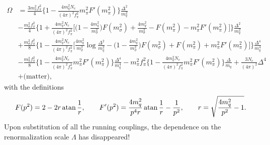 \begin{equation}
\begin{split}
	\Omega &= \frac{3 m_\pi^2 f_\pi^2}{4} \Bigg\{ 1 - \frac{4 m_q^2 N_c}{(4\pi)^2 f_\pi^2} m_\pi^2 F'(m_\pi^2) \Bigg\} \frac{\Delta^2}{m_q^2} \\
	       &- \frac{m_\sigma^2 f_\pi^2}{4} \Bigg\{ 1 + \frac{4 m_q^2 N_c}{(4\pi)^2 f_\pi^2} \Bigg[ \bigg(1 - \frac{4 m_q^2}{m_\sigma^2}\bigg) F(m_\sigma^2) + \frac{4 m_q^2}{m_\sigma^2} - F(m_\pi^2) - m_\pi^2 F'(m_\pi^2) \Bigg] \Bigg\} \frac{\Delta^2}{m_q^2} \\
	       &+ \frac{m_\sigma^2 f_\pi^2}{8} \Bigg\{ 1 - \frac{4 m_q^2 N_c}{(4 \pi)^2 f_\pi^2} \Bigg[ \frac{4 m_q^2}{m_\sigma^2} \log \frac{\Delta^2}{m_q^2} - \bigg(1 - \frac{4 m_q^2}{m_\sigma^2}\bigg) F(m_\sigma^2) + F(m_\pi^2) + m_\pi^2 F'(m_\pi^2) \Bigg] \Bigg\} \frac{\Delta^4}{m_q^4} \\
	       &- \frac{m_\pi^2 f_\pi^2}{8} \Bigg\{ 1 - \frac{4 m_q^2 N_c}{(4\pi)^2 f_\pi^2} m_\pi^2 F'(m_\pi^2) \Bigg\} \frac{\Delta^4}{m_q^4} - m_\pi^2 f_\pi^2 \Bigg\{ 1 - \frac{4 m_q^2 N_c}{(4\pi)^2 f_\pi^2} m_\pi^2 F'(m_\pi^2) \Bigg\} \frac{\Delta}{m_q} + \frac{3 N_c}{(4 \pi)^2} \Delta^4 \\
	       &+ \text{(matter)} ,
\end{split}
\label{eq:lsm2f:grand_potential_consistent}
\end{equation}
with the definitions
\begin{equation}
	F(p^2) = 2 - 2 r \operatorname{atan} \frac1r, \qquad
	F'(p^2) = \frac{4 m_q^2}{p^4 r} \operatorname{atan} \frac1r - \frac{1}{p^2}, \qquad
	r = \sqrt{\frac{4 m_q^2}{p^2}-1} .
\end{equation}
Upon substitution of all the running couplings, the dependence on the renormalization scale $\Lambda$ has disappeared!


